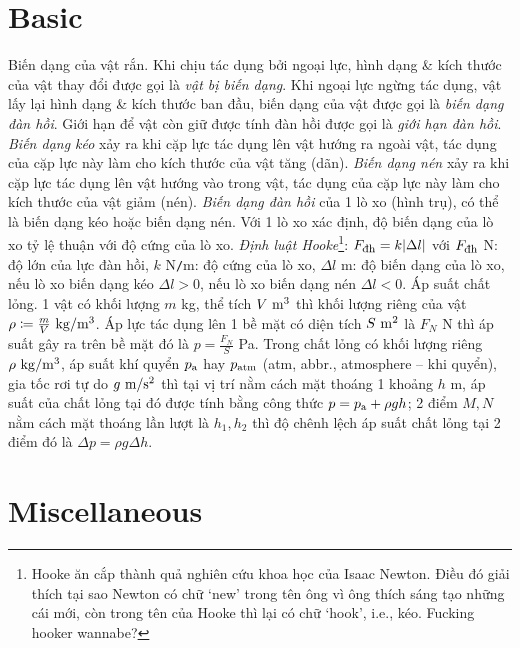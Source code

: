 \documentclass{article}
\begin{document}
\section{Basic}
 {\sf Biến dạng của vật rắn.} Khi chịu tác dụng bởi ngoại lực, hình dạng \& kích thước của vật thay đổi được gọi là {\it vật bị biến dạng}. Khi ngoại lực ngừng tác dụng, vật lấy lại hình dạng \& kích thước ban đầu, biến dạng của vật được gọi là {\it biến dạng đàn hồi}. Giới hạn để vật còn giữ được tính đàn hồi được gọi là {\it giới hạn đàn hồi}.  {\it Biến dạng kéo} xảy ra khi cặp lực tác dụng lên vật hướng ra ngoài vật, tác dụng của cặp lực này làm cho kích thước của vật tăng (dãn).  {\it Biến dạng nén} xảy ra khi cặp lực tác dụng lên vật hướng vào trong vật, tác dụng của cặp lực này làm cho kích thước của vật giảm (nén).  {\it Biến dạng đàn hồi} của 1 lò xo (hình trụ), có thể là biến dạng kéo hoặc biến dạng nén. Với 1 lò xo xác định, độ biến dạng của lò xo tỷ lệ thuận với độ cứng của lò xo.  {\it Định luật Hooke}\footnote{Hooke ăn cắp thành quả nghiên cứu khoa học của {\sc Isaac Newton}. Điều đó giải thích tại sao Newton có chữ `new' trong tên ông vì ông thích sáng tạo những cái mới, còn trong tên của Hooke thì lại có chữ `hook', i.e., kéo. Fucking hooker wannabe?}: $F_{\footnotesize\mbox{\rm đh}} = k|\Delta l|$ với $F_{\footnotesize\mbox{\rm đh}}$ N: độ lớn của lực đàn hồi, $k$ N{\tt/}m: độ cứng của lò xo, $\Delta l$ m: độ biến dạng của lò xo, nếu lò xo biến dạng kéo $\Delta l > 0$, nếu lò xo biến dạng nén $\Delta l < 0$.  {\sf Áp suất chất lỏng.} 1 vật có khối lượng $m$ kg, thể tích $V\ {\rm m}^3$ thì khối lượng riêng của vật $\rho\coloneqq\frac{m}{V}\ {\rm kg{\tt/}m^3}$. Áp lực tác dụng lên 1 bề mặt có diện tích $S\ {\rm m}^2$ là $F_N$ N thì áp suất gây ra trên bề mặt đó là $p = \frac{F_N}{S}$ Pa. Trong chất lỏng có khối lượng riêng $\rho\ {\rm kg{\tt/}m^3}$, áp suất khí quyển $p_{\rm a}$ hay $p_{\rm atm}$ (atm, abbr., atmosphere -- khi quyển), gia tốc rơi tự do $g\ {\rm m{\tt/}s^2}$ thì tại vị trí nằm cách mặt thoáng 1 khoảng $h$ m, áp suất của chất lỏng tại đó được tính bằng công thức $p = p_{\rm a} + \rho gh$; 2 điểm $M,N$ nằm cách mặt thoáng lần lượt là $h_1,h_2$ thì độ chênh lệch áp suất chất lỏng tại 2 điểm đó là $\Delta p = \rho g\Delta h$.


\section{Miscellaneous}


\printbibliography[heading=bibintoc]
	
\end{document}
